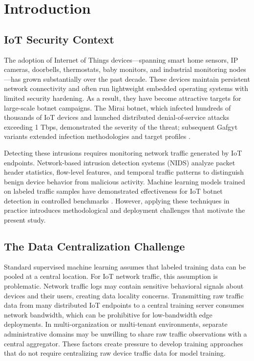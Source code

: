 \documentclass[11pt,a4paper]{article}
\begin{document}
\section{Introduction}

\subsection{IoT Security Context}
The adoption of Internet of Things devices—spanning smart home sensors, IP cameras, doorbells, thermostats, baby monitors, and industrial monitoring nodes—has grown substantially over the past decade. These devices maintain persistent network connectivity and often run lightweight embedded operating systems with limited security hardening. As a result, they have become attractive targets for large-scale botnet campaigns. The Mirai botnet, which infected hundreds of thousands of IoT devices and launched distributed denial-of-service attacks exceeding 1 Tbps, demonstrated the severity of the threat; subsequent Gafgyt variants extended infection methodologies and target profiles \cite{ref2}.

Detecting these intrusions requires monitoring network traffic generated by IoT endpoints. Network-based intrusion detection systems (NIDS) analyze packet header statistics, flow-level features, and temporal traffic patterns to distinguish benign device behavior from malicious activity. Machine learning models trained on labeled traffic samples have demonstrated effectiveness for IoT botnet detection in controlled benchmarks \cite{ref3, ref4}. However, applying these techniques in practice introduces methodological and deployment challenges that motivate the present study.

\subsection{The Data Centralization Challenge}
Standard supervised machine learning assumes that labeled training data can be pooled at a central location. For IoT network traffic, this assumption is problematic. Network traffic logs may contain sensitive behavioral signals about devices and their users, creating data locality concerns. Transmitting raw traffic data from many distributed IoT endpoints to a central training server consumes network bandwidth, which can be prohibitive for low-bandwidth edge deployments. In multi-organization or multi-tenant environments, separate administrative domains may be unwilling to share raw traffic observations with a central aggregator. These factors create pressure to develop training approaches that do not require centralizing raw device traffic data for model training.
\end{document}
